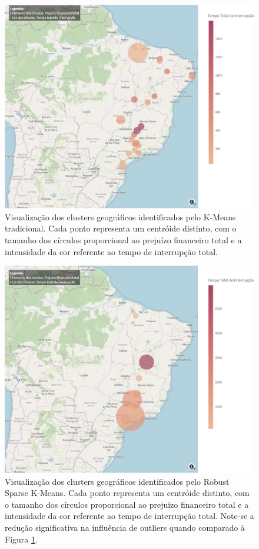 \documentclass[conference]{IEEEtran}
\begin{document}
\begin{figure}[!htb]
    \centering
    \includegraphics[width=0.99\linewidth]{kmeans_clustering.png}
    \caption{Visualização dos clusters geográficos identificados pelo K-Means tradicional. Cada ponto representa um centróide distinto, com o tamanho dos círculos proporcional ao prejuízo financeiro total e a intensidade da cor referente ao tempo de interrupção total.}
    \label{fig:cluster_map}
\end{figure}

\begin{figure}[!htb]
    \centering
    \includegraphics[width=0.99\linewidth]{robust_sparse_kmeans.png}
    \caption{Visualização dos clusters geográficos identificados pelo Robust Sparse K-Means. Cada ponto representa um centróide distinto, com o tamanho dos círculos proporcional ao prejuízo financeiro total e a intensidade da cor referente ao tempo de interrupção total. Note-se a redução significativa na influência de outliers quando comparado à Figura \ref{fig:cluster_map}.}
    \label{fig:robust_sparse_kmeans}
\end{figure}
\end{document}
